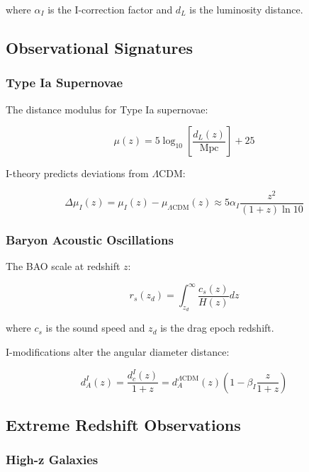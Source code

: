 where $\alpha_I$ is the I-correction factor and $d_L$ is the luminosity distance.

\subsection{Observational Signatures}

\subsubsection{Type Ia Supernovae}

The distance modulus for Type Ia supernovae:

\begin{equation}
\label{eq:distance_modulus}
\mu(z) = 5\log_{10}\left[\frac{d_L(z)}{\text{Mpc}}\right] + 25
\end{equation}

I-theory predicts deviations from $\Lambda$CDM:

\begin{equation}
\label{eq:i_deviation}
\Delta\mu_I(z) = \mu_I(z) - \mu_{\Lambda\text{CDM}}(z) \approx 5\alpha_I \frac{z^2}{(1+z)\ln 10}
\end{equation}

\subsubsection{Baryon Acoustic Oscillations}

The BAO scale at redshift $z$:

\begin{equation}
\label{eq:bao_scale}
r_s(z_d) = \int_{z_d}^\infty \frac{c_s(z)}{H(z)} dz
\end{equation}

where $c_s$ is the sound speed and $z_d$ is the drag epoch redshift.

I-modifications alter the angular diameter distance:

\begin{equation}
\label{eq:angular_diameter}
d_A^I(z) = \frac{d_c^I(z)}{1+z} = d_A^{\Lambda\text{CDM}}(z) \left(1 - \beta_I \frac{z}{1+z}\right)
\end{equation}

\subsection{Extreme Redshift Observations}

\subsubsection{High-z Galaxies}

